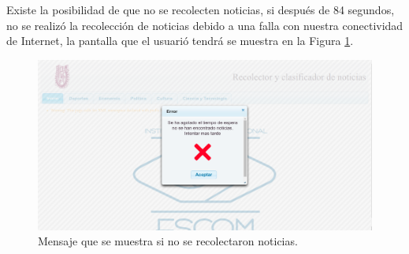 Existe la posibilidad de que no se recolecten noticias, si después de 84 segundos, no se realizó la recolección de noticias debido a una falla con nuestra conectividad de Internet, la pantalla que el usuarió tendrá se muestra en la Figura \ref{fig:notNoRec}.
\\
\begin{figure}[H]
\centering
\includegraphics[scale=0.29]{imagenes/Capitulo5/errorConectividad.png}
\caption{Mensaje que se muestra si no se recolectaron noticias.}
\label{fig:notNoRec}
\end{figure}

